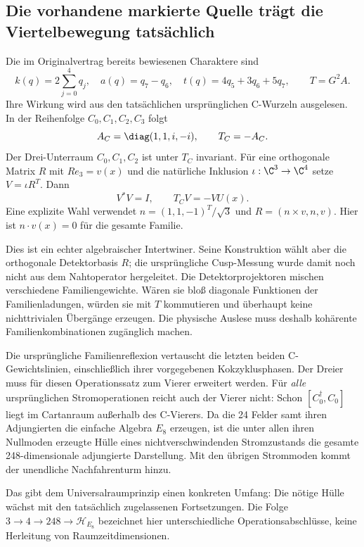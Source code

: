 \subsection{Die vorhandene markierte Quelle trägt die Viertelbewegung tatsächlich}
Die im Originalvertrag bereits bewiesenen Charaktere sind
\begin{equation}
k(q)=2\sum_{j=0}^4q_j,\quad
a(q)=q_7-q_6,\quad
t(q)=4q_5+3q_6+5q_7,
\qquad T=G^2A.
\end{equation}
Ihre Wirkung wird aus den tatsächlichen ursprünglichen C-Wurzeln ausgelesen. In der Reihenfolge $C_0,C_1,C_2,C_3$ folgt
\begin{equation}
A_C=\diag(1,1,i,-i),\qquad
T_C=-A_C.
\end{equation}
Der Drei-Unterraum $C_0,C_1,C_2$ ist unter $T_C$ invariant.
Für eine orthogonale Matrix $R$ mit $Re_3=v(x)$ und die natürliche Inklusion
$\iota:\C^3\to\C^4$ setze $V=\iota R^T$. Dann
\begin{equation}
V^*V=I,\qquad
\boxed{T_CV=-VU(x).}
\end{equation}
Eine explizite Wahl verwendet
$n=(1,1,-1)^T/\sqrt3$ und $R=(n\times v,n,v)$.
Hier ist $n\cdot v(x)=0$ für die gesamte Familie.

Dies ist ein echter algebraischer Intertwiner. Seine Konstruktion wählt aber die orthogonale Detektorbasis $R$; die ursprüngliche Cusp-Messung wurde damit noch nicht aus dem Nahtoperator hergeleitet. Die Detektorprojektoren mischen verschiedene Familiengewichte. Wären sie bloß diagonale Funktionen der Familienladungen, würden sie mit $T$ kommutieren und überhaupt keine nichttrivialen Übergänge erzeugen. Die physische Auslese muss deshalb kohärente Familienkombinationen zugänglich machen.

Die ursprüngliche Familienreflexion vertauscht die letzten beiden C-Gewichtslinien, einschließlich ihrer vorgegebenen Kokzyklusphasen. Der Dreier muss für diesen Operationssatz zum Vierer erweitert werden. Für \emph{alle} ursprünglichen Stromoperationen reicht auch der Vierer nicht: Schon
$[C_0^\dagger,C_0]$ liegt im Cartanraum außerhalb des C-Vierers. Da die 24 Felder samt ihren Adjungierten die einfache Algebra $E_8$ erzeugen, ist die unter allen ihren Nullmoden erzeugte Hülle eines nichtverschwindenden Stromzustands die gesamte 248-dimensionale adjungierte Darstellung. Mit den übrigen Strommoden kommt der unendliche Nachfahrenturm hinzu.

Das gibt dem Universalraumprinzip einen konkreten Umfang:
Die nötige Hülle wächst mit den tatsächlich zugelassenen Fortsetzungen.
Die Folge $3\to4\to248\to\mathcal H_{E_8}$ bezeichnet hier unterschiedliche Operationsabschlüsse, keine Herleitung von Raumzeitdimensionen.

